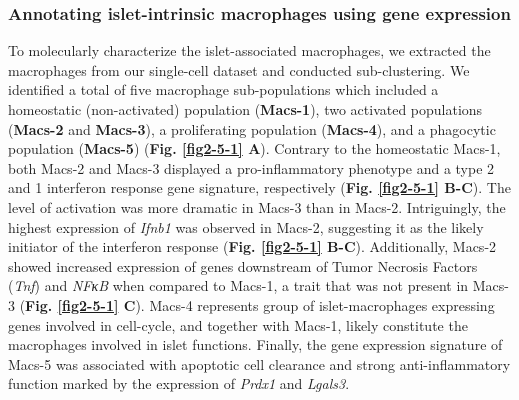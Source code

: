 \subsubsection{Annotating islet-intrinsic macrophages using gene expression}
To molecularly characterize the islet-associated macrophages, we extracted the macrophages from our single-cell dataset and conducted sub-clustering. We identified a total of five macrophage sub-populations which included a homeostatic (non-activated) population (\textbf{Macs-1}), two activated populations (\textbf{Macs-2} and \textbf{Macs-3}), a proliferating population (\textbf{Macs-4}), and a phagocytic population (\textbf{Macs-5}) (\textbf{Fig. \ref{fig2-5-1} A}). Contrary to the homeostatic Macs-1, both Macs-2 and Macs-3 displayed a pro-inflammatory phenotype and  a type 2 and 1 interferon response gene signature, respectively (\textbf{Fig. \ref{fig2-5-1} B-C}). The level of activation was more dramatic in Macs-3 than in Macs-2. Intriguingly, the highest expression of \textit{Ifnb1} was observed in Macs-2, suggesting it as the likely initiator of the interferon response (\textbf{Fig. \ref{fig2-5-1} B-C}). Additionally, Macs-2 showed increased expression of genes downstream of Tumor Necrosis Factors (\textit{Tnf}) and \textit{NFκB} when compared to Macs-1, a trait that was not present in Macs-3 (\textbf{Fig. \ref{fig2-5-1} C}). Macs-4 represents group of islet-macrophages expressing genes involved in cell-cycle, and together with Macs-1, likely constitute the macrophages involved in islet functions. Finally, the gene expression signature of Macs-5 was associated with apoptotic cell clearance and strong anti-inflammatory function marked by the expression of \textit{Prdx1} and \textit{Lgals3}.
\clearpage

